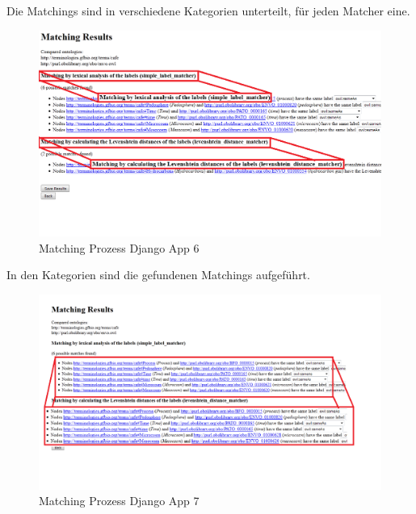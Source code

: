 		\pagebreak[4]
		Die Matchings sind in verschiedene Kategorien unterteilt, für
		jeden Matcher eine.
		\begin{figure}[h!]
		\centering
		\includegraphics[width=1.0\textwidth]{pics/SimpleOntologyMatcher-Process5.png}
		\caption{Matching Prozess Django App 6}
		\label{fig9}
		\end{figure}
		
		\pagebreak[4]
		In den Kategorien sind die gefundenen Matchings aufgeführt.
		\begin{figure}[h!]
		\centering
		\includegraphics[width=1.0\textwidth]{pics/SimpleOntologyMatcher-Process6.png}
		\caption{Matching Prozess Django App 7}
		\label{fig10}
		\end{figure}
		
